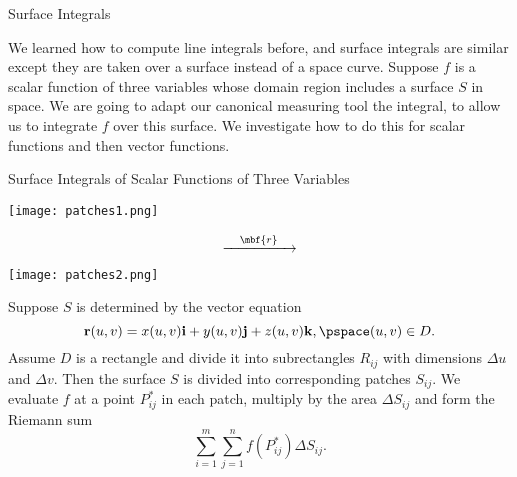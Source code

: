 \documentclass[11pt,english,
handout
]{beamer}
\begin{document}


\makebeamertitle













\begin{frame}{Surface Integrals}


We learned how to compute line integrals before, and surface integrals are similar except they are taken over a surface instead of a space curve. Suppose $f$ is a scalar function of three variables whose domain region includes a surface $S$ in space. We are going to adapt our canonical measuring tool the integral, to allow us to integrate $f$ over this surface. We investigate how to do this for scalar functions and then vector functions.

\end{frame}











\begin{frame}[t]{Surface Integrals of Scalar Functions of Three Variables}
\small
\begin{minipage}{0.4\textwidth}
\centering
\texttt{[image: patches1.png]}
\end{minipage}%
\begin{minipage}{0.2\textwidth}
\[
\xrightarrow{\quad\mbf{r}\quad}
\]
\end{minipage}%
\begin{minipage}{0.4\textwidth}
\texttt{[image: patches2.png]}
\end{minipage}%

{\footnotesize
Suppose $S$ is determined by the vector equation
\[
\mathbf{r}(u,v)=x(u,v)\mathbf{i}+y(u,v)\mathbf{j}+z(u,v)\mathbf{k},\pspace (u,v)\in D.
\]
Assume $D$ is a rectangle and divide it into subrectangles $R_{ij}$ with dimensions $\Delta u$ and $\Delta v$. Then the surface $S$ is divided into corresponding patches $S_{ij}$. We evaluate $f$ at a point $P_{ij}^*$ in each patch, multiply by the area $\Delta S_{ij}$ and form the Riemann sum
\[
\sum_{i=1}^m\sum_{j=1}^nf(P_{ij}^*)\Delta S_{ij}.
\]}
\end{frame}
\end{document}
